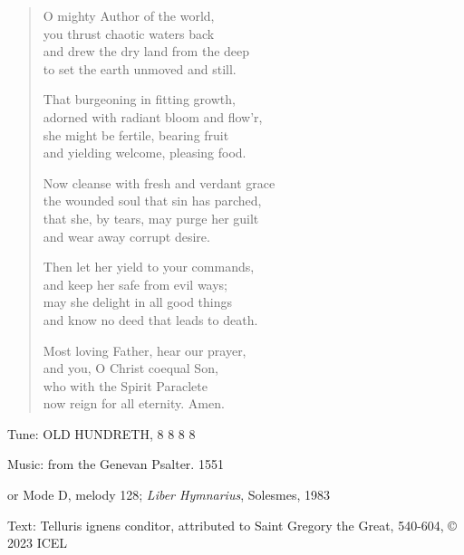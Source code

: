 \hymn

\begin{verse}
O mighty Author of the world,\\
you thrust chaotic waters back\\
and drew the dry land from the deep\\
to set the earth unmoved and still.

That burgeoning in fitting growth,\\
adorned with radiant bloom and flow’r,\\
she might be fertile, bearing fruit\\
and yielding welcome, pleasing food.

Now cleanse with fresh and verdant grace\\
the wounded soul that sin has parched,\\
that she, by tears, may purge her guilt\\
and wear away corrupt desire.

Then let her yield to your commands,\\
and keep her safe from evil ways;\\
may she delight in all good things\\
and know no deed that leads to death.

Most loving Father, hear our prayer,\\
and you, O Christ coequal Son,\\
who with the Spirit Paraclete\\
now reign for all eternity. Amen.
\end{verse}

\begin{hymnsource}
Tune: OLD HUNDRETH, 8 8 8 8

Music: from the Genevan Psalter. 1551

or Mode D, melody 128; \emph{Liber Hymnarius}, Solesmes, 1983

Text: Telluris ignens conditor, attributed to Saint Gregory the Great, 540-604, © 2023 ICEL
\end{hymnsource}
